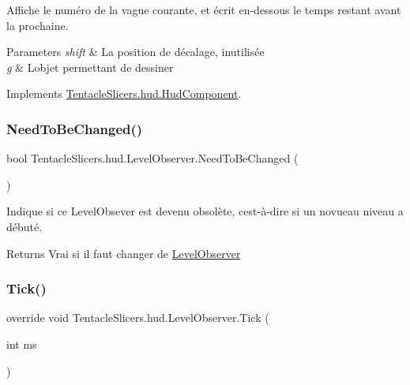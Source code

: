 Affiche le numéro de la vague courante, et écrit en-\/dessous le temps restant avant la prochaine. 


\begin{DoxyParams}{Parameters}
{\em shift} & La position de décalage, inutilisée \\
\hline
{\em g} & L\textquotesingle{}objet permettant de dessiner \\
\hline
\end{DoxyParams}


Implements \hyperlink{class_tentacle_slicers_1_1hud_1_1_hud_component}{Tentacle\+Slicers.\+hud.\+Hud\+Component}.

\mbox{\label{class_tentacle_slicers_1_1hud_1_1_level_observer_a1acbdfbdd3aa51344506ebaf2460832e}} 
\subsubsection{\texorpdfstring{Need\+To\+Be\+Changed()}{NeedToBeChanged()}}
{\footnotesize\ttfamily bool Tentacle\+Slicers.\+hud.\+Level\+Observer.\+Need\+To\+Be\+Changed (\begin{DoxyParamCaption}{ }\end{DoxyParamCaption})}



Indique si ce Level\+Obsever est devenu obsolète, c\textquotesingle{}est-\/à-\/dire si un novueau niveau a débuté. 

\begin{DoxyReturn}{Returns}
Vrai si il faut changer de \hyperlink{class_tentacle_slicers_1_1hud_1_1_level_observer}{Level\+Observer} 
\end{DoxyReturn}
\mbox{\label{class_tentacle_slicers_1_1hud_1_1_level_observer_a5dab8038fd2cf8a3ec165aaef11cfd73}} 
\subsubsection{\texorpdfstring{Tick()}{Tick()}}
{\footnotesize\ttfamily override void Tentacle\+Slicers.\+hud.\+Level\+Observer.\+Tick (\begin{DoxyParamCaption}\item[{int}]{ms }\end{DoxyParamCaption})\hspace{0.3cm}{\ttfamily [virtual]}}



